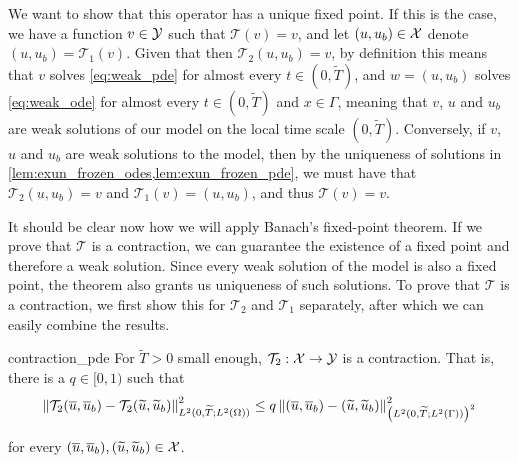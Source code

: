 \noindent
We want to show that this operator has a unique fixed point. If this is the case, we have a function $v \in \mathcal{Y}$ such that $\mathcal{T}(v) = v$, and let $(u, u_b) \in \mathcal{X}$ denote $(u, u_b) = \mathcal{T}_{1}(v)$. Given that then $\mathcal{T}_{2}(u, u_b) = v$, by definition this means that $v$ solves \cref{eq:weak_pde} for almost every $t \in (0, \widetilde{T})$, and $w = (u, u_b)$ solves \cref{eq:weak_ode} for almost every $t \in (0, \widetilde{T})$ and $x \in \Gamma$, meaning that $v$, $u$ and $u_b$ are weak solutions of our model on the local time scale $(0, \widetilde{T})$. Conversely, if $v$, $u$ and $u_b$ are weak solutions to the model, then by the uniqueness of solutions in \cref{lem:exun_frozen_odes,lem:exun_frozen_pde}, we must have that $\mathcal{T}_{2}(u, u_b) = v$ and $\mathcal{T}_{1}(v) = (u, u_b)$, and thus $\mathcal{T}(v) = v$.

It should be clear now how we will apply Banach's fixed-point theorem. If we prove that $\mathcal{T}$ is a contraction, we can guarantee the existence of a fixed point and therefore a weak solution. Since every weak solution of the model is also a fixed point, the theorem also grants us uniqueness of such solutions. To prove that $\mathcal{T}$ is a contraction, we first show this for $\mathcal{T}_{2}$ and $\mathcal{T}_{1}$ separately, after which we can easily combine the results.

\begingroup
\newcommand{\vb}{\overline{v}}
\newcommand{\vt}{\widetilde{v}}
\newcommand{\ub}{\overline{u}}
\newcommand{\ut}{\widetilde{u}}
\newcommand{\ubb}{\overline{u}_b}
\newcommand{\ubt}{\widetilde{u}_b}

\begin{lemma}{}{contraction_pde}
    For $\widetilde{T} > 0$ small enough, $\mathcal{T}_{2}: \mathcal{X} \to \mathcal{Y}$ is a contraction. That is, there is a $q \in [0, 1)$ such that
    \begin{equation*}
        \norm{\mathcal{T}_{2} (\ub, \ubb) - \mathcal{T}_{2} (\ut, \ubt)}_{\Ltwo{0, \widetilde{T}; \Ltwo{\Omega}}}^2 \leq q \norm{(\ub, \ubb) - (\ut, \ubt)}_{\left(\Ltwo{0, \widetilde{T}; \Ltwo{\Gamma}}\right)^2}^2
    \end{equation*}

    for every $(\ub, \ubb), (\ut, \ubt) \in \odespace$.
\end{lemma}

